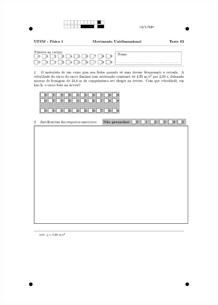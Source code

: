 \begin{figure}[H]\centering
\includegraphics[scale=0.7]{fig/orp1q1_page-0002.jpg}
\end{figure}
\vspace*{\fill}
